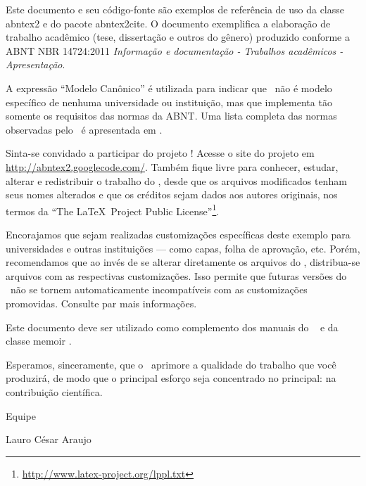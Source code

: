 Este documento e seu código-fonte são exemplos de referência de uso da classe
\textsf{abntex2} e do pacote \textsf{abntex2cite}. O documento 
exemplifica a elaboração de trabalho acadêmico (tese, dissertação e outros do
gênero) produzido conforme a ABNT NBR 14724:2011 \emph{Informação e documentação
	- Trabalhos acadêmicos - Apresentação}.

A expressão ``Modelo Canônico'' é utilizada para indicar que \abnTeX\ não é
modelo específico de nenhuma universidade ou instituição, mas que implementa tão
somente os requisitos das normas da ABNT. Uma lista completa das normas
observadas pelo \abnTeX\ é apresentada em .

Sinta-se convidado a participar do projeto \abnTeX! Acesse o site do projeto em
\url{http://abntex2.googlecode.com/}. Também fique livre para conhecer,
estudar, alterar e redistribuir o trabalho do \abnTeX, desde que os arquivos
modificados tenham seus nomes alterados e que os créditos sejam dados aos
autores originais, nos termos da ``The \LaTeX\ Project Public
License''\footnote{\url{http://www.latex-project.org/lppl.txt}}.

Encorajamos que sejam realizadas customizações específicas deste exemplo para
universidades e outras instituições --- como capas, folha de aprovação, etc.
Porém, recomendamos que ao invés de se alterar diretamente os arquivos do
\abnTeX, distribua-se arquivos com as respectivas customizações.
Isso permite que futuras versões do \abnTeX~não se tornem automaticamente
incompatíveis com as customizações promovidas. Consulte
 par mais informações.

Este documento deve ser utilizado como complemento dos manuais do \abnTeX\ 
\cite{abntex2classe,abntex2cite,abntex2cite-alf} e da classe \textsf{memoir}
\cite{memoir}. 

Esperamos, sinceramente, que o \abnTeX\ aprimore a qualidade do trabalho que
você produzirá, de modo que o principal esforço seja concentrado no principal:
na contribuição científica.

Equipe \abnTeX 

Lauro César Araujo


